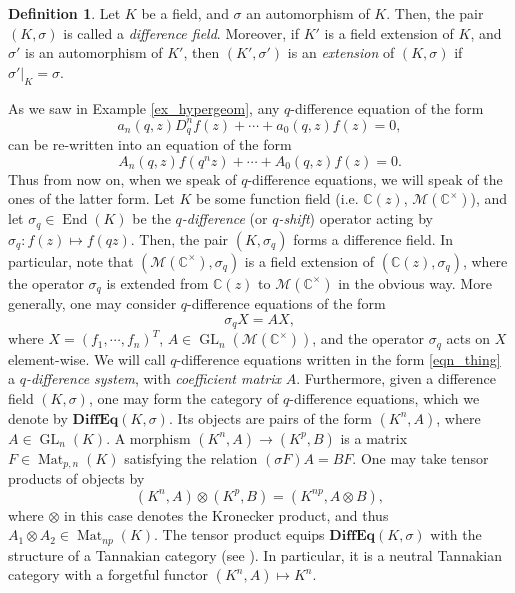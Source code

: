 \documentclass[a4paper]{report}
\theoremstyle{theorem}
\theoremstyle{definition}
\newtheorem{definition}{Definition}
\theoremstyle{remark}
\theoremstyle{proposition}
\theoremstyle{conjecture}
\theoremstyle{lemma}
\theoremstyle{corollary}
\theoremstyle{exercise}
\theoremstyle{example}
\newcommand{\C}{\mathbb{C}}
\newcommand{\mcal}{\mathcal}
\newcommand{\on}{\operatorname}
\begin{document}
  \begin{definition}\label{def_extension}
      Let $K$ be a field, and $\sigma$ an automorphism of $K$. Then, the pair
      $(K,\sigma)$ is called a \emph{difference field}. Moreover, if $K'$ is a
      field extension of $K$, and $\sigma'$ is an automorphism of $K'$,
      then $(K',\sigma')$ is an \emph{extension} of $(K,\sigma)$ 
      if $\sigma'\vert_K = \sigma$.
  \end{definition}
  As we saw in Example \ref{ex_hypergeom}, any $q$-difference equation of the
  form $$a_n(q,z)D_q^nf(z) + \cdots + a_0(q,z) f(z) = 0,$$
  can be re-written into an equation of the form 
  $$A_n(q,z) f(q^nz) + \cdots + A_0(q,z)f(z) = 0.$$
  Thus from now on, when we speak of $q$-difference equations, we will 
  speak of the ones of the latter form. 
  Let $K$ be some function field (i.e. $\C(z)$, $\mcal{M}(\C^\times)$), 
  and let $\sigma_q \in \on{End}(K)$ be the 
  \emph{$q$-difference} (or \emph{$q$-shift}) operator acting by 
  $\sigma_q : f(z) \mapsto f(qz)$. Then, the pair $(K,\sigma_q)$ forms a 
  difference field. In particular, note that $(\mcal{M}(\C^\times),\sigma_q)$
  is a field extension of $(\C(z), \sigma_q)$, where the operator $\sigma_q$ is extended 
  from $\C(z)$ to $\mcal{M}(\C^\times)$ in the obvious way. 
  More generally, one may consider $q$-difference equations of the form 
  \begin{equation}\label{eqn_thing}
      \sigma_q X = AX,
      \end{equation}
  where $X = (f_1,\cdots,f_n)^T$, $A \in \on{GL}_n(\mcal{M}(\C^\times))$, and the 
  operator $\sigma_q$ acts on $X$ element-wise. We will call $q$-difference 
  equations written in the form \eqref{eqn_thing} a \emph{$q$-difference system}, 
  with \emph{coefficient matrix} $A$.
  Furthermore, given a difference field $(K,\sigma)$,
  one may form the category of $q$-difference equations, which we denote by 
  $\mathbf{DiffEq}(K,\sigma)$. Its objects are pairs of the form 
  $(K^n,A)$, where $A\in \on{GL}_n(K)$. A morphism $(K^n,A) \to (K^p,B)$ 
  is a matrix $F \in \on{Mat}_{p,n}(K)$ satisfying the relation $(\sigma F)A = BF$.
  One may take tensor products of objects by 
  $$(K^n,A) \otimes (K^p,B) = (K^{np},A\otimes B),$$
  where $\otimes$ in this case denotes the Kronecker product, 
  and thus $A_1\otimes A_2 \in \on{Mat}_{np}(K)$. The tensor product 
  equips $\mathbf{DiffEq}(K,\sigma)$ with the structure of a Tannakian category
  (see \cite[\S 1.1.2]{sauloy03}). In particular, it is a neutral Tannakian
  category with a forgetful functor $(K^n,A) \mapsto K^n$.
\end{document}
